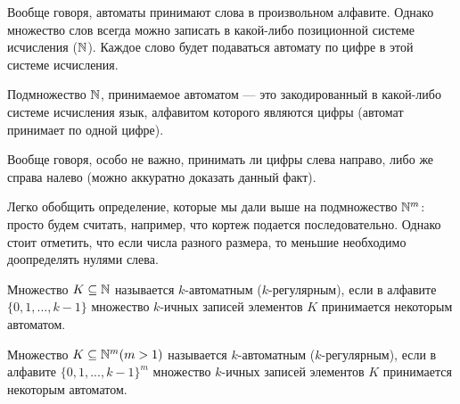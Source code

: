     \begin{Rem}
        Вообще говоря, автоматы принимают слова в произвольном алфавите. Однако множество слов всегда можно записать в какой-либо позиционной системе исчисления ($\N$). Каждое слово будет подаваться автомату по цифре в этой системе исчисления.  
    \end{Rem}
    \begin{Def}[Подмножество $\N$]
        Подмножество $\N$, принимаемое автоматом --- это закодированный в какой-либо системе исчисления язык, алфавитом которого являются цифры (автомат принимает по одной цифре). 
    \end{Def}
    \begin{Rem}
        Вообще говоря, особо не важно, принимать ли цифры слева направо, либо же справа налево (можно аккуратно доказать данный факт).
    \end{Rem}
    \begin{Rem}
        Легко обобщить определение, которые мы дали выше на подмножество $\mathbb{N}^m$: просто будем считать, например, что кортеж подается последовательно. Однако стоит отметить, что если числа разного размера, то меньшие необходимо доопределять нулями слева.
    \end{Rem}
    \begin{Def}
        Множество $K \subseteq \mathbb{N}$ называется $k$-автоматным ($k$-регулярным), если в алфавите $\{0, 1, ..., k - 1\}$ множество $k$-ичных записей элементов $K$ принимается некоторым автоматом.
    \end{Def}
        \begin{Def}
        Множество $K \subseteq \mathbb{N}^m (m > 1)$ называется $k$-автоматным ($k$-регулярным), если в алфавите $\{0, 1, ..., k - 1\}^m$ множество $k$-ичных записей элементов $K$ принимается некоторым автоматом.
    \end{Def}
    


